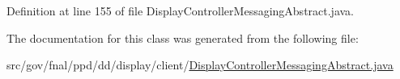 Definition at line 155 of file Display\-Controller\-Messaging\-Abstract.\-java.



The documentation for this class was generated from the following file\-:\begin{DoxyCompactItemize}
\item 
src/gov/fnal/ppd/dd/display/client/\hyperlink{DisplayControllerMessagingAbstract_8java}{Display\-Controller\-Messaging\-Abstract.\-java}\end{DoxyCompactItemize}
